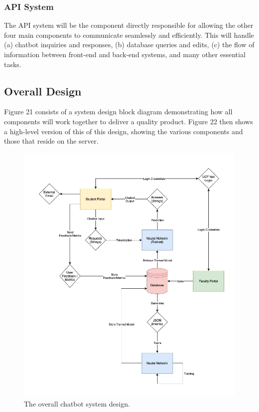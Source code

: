 \documentclass[titlepage, 12pt]{article}
\begin{document}
\subsubsection{API System}

The API system will be the component directly responsible for allowing the other four main components to communicate seamlessly and efficiently. This will handle (a) chatbot inquiries and responses, (b) database queries and edits, (c) the flow of information between front-end and back-end systems, and many other essential tasks.

\subsection{Overall Design}

Figure 21 consists of a system design block diagram demonstrating how all components will work together to deliver a quality product. Figure 22 then shows a high-level version of this of this design, showing the various components and those that reside on the server.

\begin{figure}[p]
    \centering\includegraphics[width=1\linewidth]{images/system-design.jpg}
    \caption{The overall chatbot system design.}
\end{figure}
\end{document}
